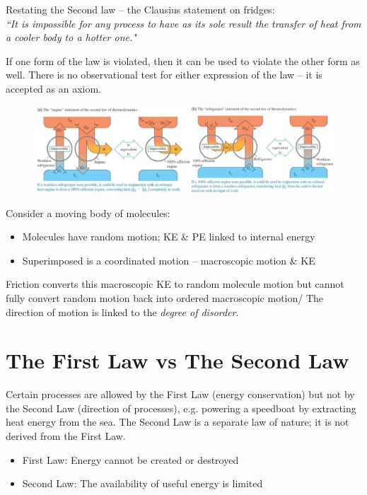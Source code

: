 \documentclass[a4paper, 11pt, normalem]{report}
\begin{document}
Restating the Second law -- the Clausius statement on fridges: \\
\emph{``It is impossible for any process to have as its sole result the transfer of heat from a cooler body to a hotter one."}

If one form of the law is violated, then it can be used to violate the other form as well.
There is no observational test for either expression of the law -- it is accepted as an axiom.
\begin{figure}[H]
    \centering
    \includegraphics[scale=0.69]{Impossible.jpg}
\end{figure}
Consider a moving body of molecules:
\begin{itemize}
	\item Molecules have random motion; KE \& PE linked to internal energy
	\item Superimposed is a coordinated motion -- macroscopic motion \& KE
\end{itemize}
Friction converts this macroscopic KE to random molecule motion but cannot fully convert random motion back into ordered macroscopic motion/
The direction of motion is linked to the \emph{degree of disorder}.

\section{The First Law vs The Second Law}
Certain processes are allowed by the First Law (energy conservation) but not by the Second Law (direction of processes), e.g. powering a speedboat by extracting heat energy from the sea.
The Second Law is a separate law of nature; it is not derived from the First Law.

\begin{itemize}
    \item First Law: Energy cannot be created or destroyed
    \item Second Law: The availability of useful energy is limited
\end{itemize}
\end{document}
